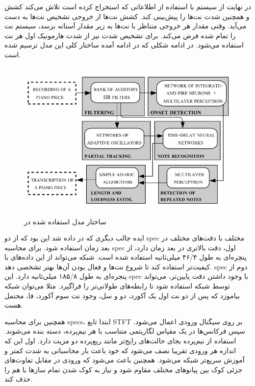 در نهایت از سیستم با استفاده از اطلاعاتی که استخراج کرده است تلاش می‌کند کشش و
همچنین شدت نت‌ها را پیش‌بینی کند. کشش نت‌ها از خروجی تشخیص نت‌ها به دست می‌آید.
وقتی مقدار هر خروجی متناظر با نت‌ها به زیر مقدار آستانه برسد، سیستم نت را تمام
شده فرض می‌کند. برای تشخیص شدت نیز از شدت هارمونیک اول هر نت استفاده می‌شود. در
ادامه شکلی که در ادامه آمده ساختار کلی این مدل ترسیم شده است.
\begin{figure}[ht]
    \centering
    \includegraphics[height=8cm]{./statics/marolt2004connectionist_architecture.png}
    \caption{ساختار مدل استفاده شده در \cite{marolt2004connectionist}}
\end{figure}

ایده جالب دیگری که در \cite{bock2012polyphonic} داده شد این بود که از دو
\gls{spec} مختلف با دقت‌های مختلف در بعد زمان استفاده شود. برای محاسبه
\gls{spec} اول، دقت بالاتری در بعد زمان دارد، از پنچره‌ای به طول ۴۶/۴ میلی‌ثانیه
استفاده شده است. شبکه می‌تواند از این داده‌های با کیفیت‌تر استفاده کند تا شروع
نت‌ها و فعال بودن آن‌ها بهتر تشخصی دهد. \gls{spec} دوم از پنجره‌ای به طول ۱۸۵/۸
میلی‌ثانیه دارد. این \gls{spec} با وجود داشتن دقت پایین‌تر، می‌تواند توسط شبکه
استفاده شود تا رابطه‌های طولانی‌تر را فراگیرد. مثلا می‌توان شبکه بیاموزد که پس
از دو نت اول یک آکورد، دو و سل، وجود نت سوم آکورد، فا، محتمل هست.

همچنین برای محاسبه \glspl{spec}، ابتدا تابع \gls{STFT} بر روی سیگنال ورودی اعمال
می‌شود. سپس فرکانس‌ها در یک مقیاس لگاریتمی متناسب با هر نیم‌پرده، دسته بنده
می‌شوند. استفاده از نیم‌پرده بجای حالت‌های رایج‌تر مانند ربع‌پرده دو مزیت دارد.
اول این که اندازه هر ورودی تقریبا نصف می‌شود که خود باعث بار محاسباتی به شدت
کمتر و آموزش سریع‌تر شبکه می‌شود. همچنین باعث می‌شود که ورودی در مقابل تفاوت‌های
جزئی کوک بین پیانو‌های مختلف مقاوم شود و نیاز به کوک شدن تمام سازها با هم را حذف
کند.

